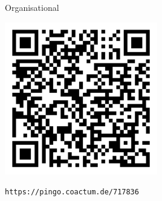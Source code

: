 \begin{frame}{Organisational}

	\begin{center}

		\includegraphics[width=0.5\textwidth]{04_Data_Structures/qr.png}
	
		\vspace{1em}

		\texttt{https://pingo.coactum.de/717836}

	\end{center}

\end{frame}



